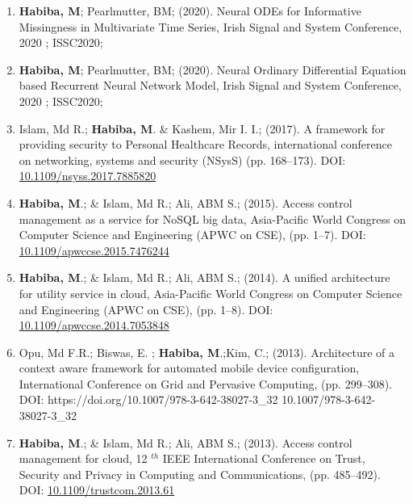 \documentclass[12pt,parskip=half]{scrartcl}
\begin{document}
\begin{enumerate}
  \leftskip-0.13in %
  
   \item \textbf{Habiba, M}; Pearlmutter, BM; (2020). Neural ODEs for Informative Missingness in Multivariate Time Series, Irish Signal and System Conference, 2020 ; ISSC2020; 
  
  \item \textbf{Habiba, M}; Pearlmutter, BM; (2020). Neural Ordinary Differential Equation based Recurrent Neural Network Model, Irish Signal and System Conference, 2020 ; ISSC2020;
  \item Islam, Md R.; \textbf{Habiba, M}. \& Kashem, Mir I. I.; (2017). A framework for providing security to Personal Healthcare Records, international conference on networking, systems and security (NSysS) (pp. 168--173). DOI: \href{https://doi.org/10.1109/nsyss.2017.7885820 }{10.1109/nsyss.2017.7885820}
  
  
   \item \textbf{Habiba, M}.; \& Islam, Md R.; Ali, ABM S.; (2015). Access control management as a service for NoSQL big data, Asia-Pacific World Congress on Computer Science and Engineering (APWC on CSE), (pp. 1--7). DOI: \href{https://doi.org/10.1109/apwccse.2015.7476244 }{10.1109/apwccse.2015.7476244}
  
   \item \textbf{Habiba, M}.; \& Islam, Md R.; Ali, ABM S.; (2014). A unified architecture for utility service in cloud, Asia-Pacific World Congress on Computer Science and Engineering (APWC on CSE), (pp. 1--8). DOI: \href{https://doi.org/10.1109/apwccse.2014.7053848 }{10.1109/apwccse.2014.7053848}
 
  \item Opu, Md F.R.; Biswas, E. ; \textbf{Habiba, M}.;Kim, C.; (2013). Architecture of a context aware framework for automated mobile device configuration, International Conference on Grid and Pervasive Computing, (pp. 299--308). DOI: {https://doi.org/10.1007/978-3-642-38027-3\_32  }{10.1007/978-3-642-38027-3\_32}
 
 \item \textbf{Habiba, M}.; \& Islam, Md R.; Ali, ABM S.; (2013). Access control management for cloud, 12 $^{th}$ IEEE International Conference on Trust, Security and Privacy in Computing and Communications, (pp. 485--492). DOI: \href{https://doi.org/10.1109/trustcom.2013.61 }{10.1109/trustcom.2013.61 }


\end{enumerate}
\end{document}
